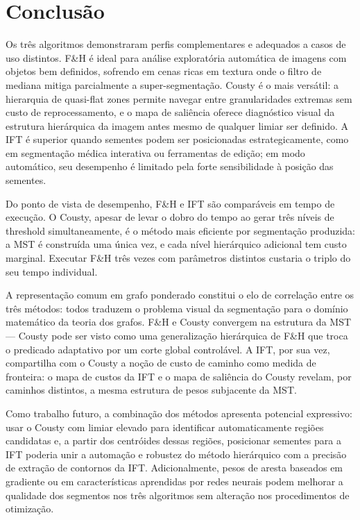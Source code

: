 \documentclass{sbc2023}
\begin{document}
\section{Conclusão}
\label{sec:conclusao}

Os três algoritmos demonstraram perfis complementares e adequados a casos de uso
distintos. F\&H é ideal para análise exploratória automática de imagens com
objetos bem definidos, sofrendo em cenas ricas em textura onde o filtro de
mediana mitiga parcialmente a super-segmentação. Cousty é o mais versátil: a
hierarquia de quasi-flat zones permite navegar entre granularidades extremas sem
custo de reprocessamento, e o mapa de saliência oferece diagnóstico visual da
estrutura hierárquica da imagem antes mesmo de qualquer limiar ser definido. A
IFT é superior quando sementes podem ser posicionadas estrategicamente, como em
segmentação médica interativa ou ferramentas de edição; em modo automático, seu
desempenho é limitado pela forte sensibilidade à posição das sementes.

Do ponto de vista de desempenho, F\&H e IFT são comparáveis em tempo de
execução. O Cousty, apesar de levar o dobro do tempo ao gerar três níveis de
threshold simultaneamente, é o método mais eficiente por segmentação produzida:
a MST é construída uma única vez, e cada nível hierárquico adicional tem custo
marginal. Executar F\&H três vezes com parâmetros distintos custaria o triplo do
seu tempo individual.

A representação comum em grafo ponderado constitui o elo de correlação entre os
três métodos: todos traduzem o problema visual da segmentação para o domínio
matemático da teoria dos grafos. F\&H e Cousty convergem na estrutura da MST —
Cousty pode ser visto como uma generalização hierárquica de F\&H que troca o
predicado adaptativo por um corte global controlável. A IFT, por sua vez,
compartilha com o Cousty a noção de custo de caminho como medida de fronteira:
o mapa de custos da IFT e o mapa de saliência do Cousty revelam, por caminhos
distintos, a mesma estrutura de pesos subjacente da MST.

Como trabalho futuro, a combinação dos métodos apresenta potencial expressivo:
usar o Cousty com limiar elevado para identificar automaticamente regiões
candidatas e, a partir dos centróides dessas regiões, posicionar sementes para a
IFT poderia unir a automação e robustez do método hierárquico com a precisão de
extração de contornos da IFT. Adicionalmente, pesos de aresta baseados em
gradiente ou em características aprendidas por redes neurais podem melhorar
a qualidade dos segmentos nos três algoritmos sem alteração nos procedimentos
de otimização.
\end{document}
